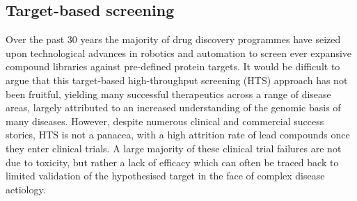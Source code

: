 \documentclass[a4paper,11pt,twoside,openright]{scrbook}
\begin{document}


\subsection{Target-based screening}
Over the past 30 years the majority of drug discovery programmes have seized upon technological advances in robotics and automation to screen ever expansive compound libraries against pre-defined protein targets.
It would be difficult to argue that this target-based high-throughput screening (HTS) approach has not been fruitful, yielding many successful therapeutics across a range of disease areas, largely attributed to an increased understanding of the genomic basis of many diseases.
However, despite numerous clinical and commercial success stories, HTS is not a panacea, with a high attrition rate of lead compounds once they enter clinical trials. \cite{Waring2015}
A large majority of these clinical trial failures are not due to toxicity, but rather a lack of efficacy which can often be traced back to limited validation of the hypothesised target in the face of complex disease aetiology. \cite{Harrison2016}
\end{document}
